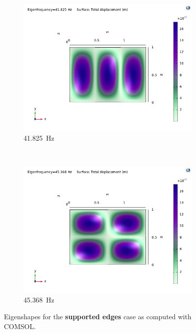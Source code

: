 \documentclass[a4paper]{article}
\begin{document}
\begin{figure}[h]
	\begin{subfigure}[b]{0.31\linewidth}
		\includegraphics[width=0.9\linewidth]{comsol/4ss.png}
		\caption*{\SI{41.825}{\hertz}}
	\end{subfigure}
	~
	\begin{subfigure}[b]{0.31\linewidth}
		\includegraphics[width=0.9\linewidth]{comsol/5ss.png}
		\caption*{\SI{45.368}{\hertz}}
	\end{subfigure}
	\caption{Eigenshapes for the \textbf{supported edges} case as computed with COMSOL.}
	\label{fig:ss_com}
\end{figure}
\end{document}

